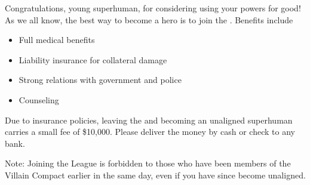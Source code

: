 \documentclass[white]{guildcamp1}
\begin{document}
\name{\wHeroRecruitment{}}

Congratulations, young superhuman, for considering using your powers for good!  As we all know, the best way to become a hero is to join the \cHeroLeague{\intro}.  Benefits include

\begin{itemize}
\item Full medical benefits
\item Liability insurance for collateral damage
\item Strong relations with government and police
\item Counseling
\end{itemize}

Due to insurance policies, leaving the \cHeroLeague{} and becoming an unaligned superhuman carries a small fee of \$10,000.  Please deliver the money by cash or check to any bank.

Note: Joining the League is forbidden to those who have been members of the Villain Compact earlier in the same day, even if you have since become unaligned.
\end{document}
